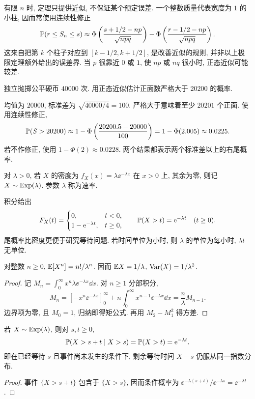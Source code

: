 有限 $n$ 时, 定理只提供近似, 不保证某个预定误差. 一个整数质量代表宽度为 $1$ 的小柱, 因而常使用连续性修正
\[
 \mathbb P(r\le S_n\le s)\approx
 \Phi\left(\frac{s+1/2-np}{\sqrt{npq}}\right)
 -\Phi\left(\frac{r-1/2-np}{\sqrt{npq}}\right).
\]
这来自把第 $k$ 个柱子对应到 $[k-1/2,k+1/2]$, 是改善近似的规则, 并非以上极限定理额外给出的误差界. 当 $p$ 很靠近 $0$ 或 $1$, 使 $np$ 或 $nq$ 很小时, 正态近似可能较差.

\begin{example}
独立抛掷公平硬币 $40000$ 次. 用正态近似估计正面数严格大于 $20200$ 的概率.
\end{example}
\begin{solution}
均值为 $20000$, 标准差为 $\sqrt{40000/4}=100$. 严格大于意味着至少 $20201$ 个正面. 使用连续性修正,
\[
 \mathbb P(S>20200)\approx1-\Phi\left(\frac{20200.5-20000}{100}\right)
 =1-\Phi(2.005)\approx0.0225.
\]
若不作修正, 使用 $1-\Phi(2)\approx0.0228$. 两个结果都表示两个标准差以上的右尾概率.
\end{solution}


\begin{definition}[指数分布]
对 $\lambda>0$, 若 $X$ 的密度为 $f_X(x)=\lambda\ee^{-\lambda x}$ 在 $x>0$ 上, 其余为零, 则记 $X\sim\operatorname{Exp}(\lambda)$. 参数 $\lambda$ 称为速率.
\end{definition}

积分给出
\[
 F_X(t)=\begin{cases}0,&t<0,\\1-\mathrm e^{-\lambda t},&t\ge0,\end{cases}
 \qquad \mathbb P(X>t)=\mathrm e^{-\lambda t}\quad(t\ge0).
\]
尾概率比密度更便于研究等待问题. 若时间单位为小时, 则 $\lambda$ 的单位为每小时, $\lambda t$ 无单位.

\begin{proposition}[指数矩]
对整数 $n\ge0$, $\mathbb E[X^n]=n!/\lambda^n$. 因而 $\mathbb E X=1/\lambda$, $\operatorname{Var}(X)=1/\lambda^2$.
\end{proposition}
\begin{proof}
记 $M_n=\int_0^\infty x^n\lambda\ee^{-\lambda x}\dd x$. 对 $n\ge1$ 分部积分,
\[
 M_n=[-x^n\ee^{-\lambda x}]_0^\infty
       +n\int_0^\infty x^{n-1}\ee^{-\lambda x}\dd x
     =\frac n\lambda M_{n-1}.
\]
边界项为零, 且 $M_0=1$, 归纳即得矩公式. 再用 $M_2-M_1^2$ 得方差.
\end{proof}

\begin{theorem}[无记忆性]
若 $X\sim\operatorname{Exp}(\lambda)$, 则对 $s,t\ge0$,
\[
 \mathbb P(X>s+t\mid X>s)=\mathbb P(X>t)=\mathrm e^{-\lambda t}.
\]
即在已经等待 $s$ 且事件尚未发生的条件下, 剩余等待时间 $X-s$ 仍服从同一指数分布.
\end{theorem}
\begin{proof}
事件 $\{X>s+t\}$ 包含于 $\{X>s\}$, 因而条件概率为
$\ee^{-\lambda(s+t)}/\ee^{-\lambda s}=\ee^{-\lambda t}$.
\end{proof}

